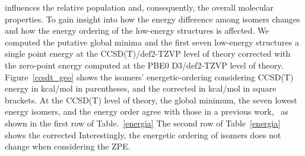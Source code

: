 \documentclass[prb,aps,preprint,showkeys,showpacs]{revtex4}
\begin{document}
influences the relative population and, consequently, the overall molecular properties.  To gain insight into how the energy difference among isomers changes and how the energy ordering of the low-energy structures is affected.  We computed the putative global minima and the first seven low-energy structures a single point energy at the CCSD(T)/def2-TZVP level of theory corrected with the zero-point energy computed at the PBE0 D3/def2-TZVP level of theory. Figure~\ref{ccsdt_geo} shows the isomers’ energetic-ordering considering CCSD(T) energy in kcal/mol in parentheses, and the corrected  in kcal/mol in square brackets. At the CCSD(T) level of theory, the global minimum, the seven lowest energy isomers, and the energy order agree with those in a previous work,~\cite{Osvaldo} as shown in the first row of Table.~\ref{energia} The second row of Table~\ref{energia} shows the corrected  Interestingly, the energetic ordering of isomers does not change when considering the ZPE.
\end{document}
